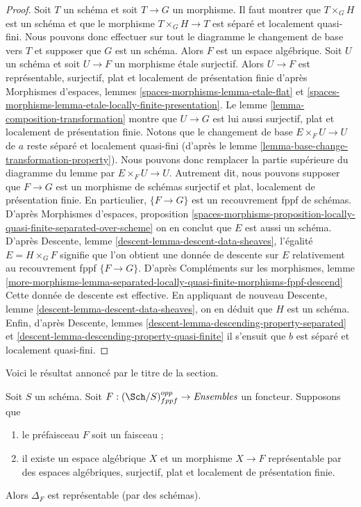 \begin{proof}
Soit $T$ un schéma et soit $T \to G$ un morphisme.
Il faut montrer que $T \times_G H$ est un schéma et que
le morphisme $T \times_G H \to T$ est séparé et
localement quasi-fini. Nous pouvons donc effectuer sur tout le diagramme le changement de base vers $T$
et supposer que $G$ est un schéma. Alors $F$ est un espace algébrique.
Soit $U$ un schéma et soit $U \to F$ un morphisme étale surjectif.
Alors $U \to F$ est représentable, surjectif, plat et
localement de présentation finie d'après
Morphismes d'espaces,
lemmes \ref{spaces-morphisms-lemma-etale-flat} et
\ref{spaces-morphisms-lemma-etale-locally-finite-presentation}.
Le
lemme \ref{lemma-composition-transformation}
montre que $U \to G$ est lui aussi surjectif, plat et localement de présentation finie.
Notons que le changement de base $E \times_F U \to U$ de $a$ reste
séparé et localement quasi-fini (d'après le
lemme \ref{lemma-base-change-transformation-property}). Nous pouvons donc
remplacer la partie supérieure du diagramme du lemme par
$E \times_F U \to U$. Autrement dit, nous pouvons supposer que
$F \to G$ est un morphisme de schémas surjectif et plat,
localement de présentation finie.
En particulier, $\{F \to G\}$ est un recouvrement fppf de schémas.
D'après
Morphismes d'espaces, proposition
\ref{spaces-morphisms-proposition-locally-quasi-finite-separated-over-scheme}
on en conclut que $E$ est aussi un schéma.
D'après
Descente, lemme \ref{descent-lemma-descent-data-sheaves},
l'égalité $E = H \times_G F$ signifie que l'on obtient une donnée de descente
sur $E$ relativement au recouvrement fppf $\{F \to G\}$.
D'après
Compléments sur les morphismes, lemme
\ref{more-morphisms-lemma-separated-locally-quasi-finite-morphisms-fppf-descend}
Cette donnée de descente est effective.
En appliquant de nouveau
Descente, lemme \ref{descent-lemma-descent-data-sheaves},
on en déduit que $H$ est un schéma.
Enfin, d'après
Descente, lemmes \ref{descent-lemma-descending-property-separated} et
\ref{descent-lemma-descending-property-quasi-finite}
il s'ensuit que $b$ est séparé et localement quasi-fini.
\end{proof}

\noindent
Voici le résultat annoncé par le titre de la section.

\begin{lemma}
\label{lemma-bootstrap-diagonal}
Soit $S$ un schéma.
Soit $F : (\Sch/S)_{fppf}^{opp} \to \textit{Ensembles}$ un foncteur.
Supposons que
\begin{enumerate}
\item le préfaisceau $F$ soit un faisceau ;
\item il existe un espace algébrique $X$ et un morphisme $X \to F$
représentable par des espaces algébriques, surjectif, plat et
localement de présentation finie.
\end{enumerate}
Alors $\Delta_F$ est représentable (par des schémas).
\end{lemma}


